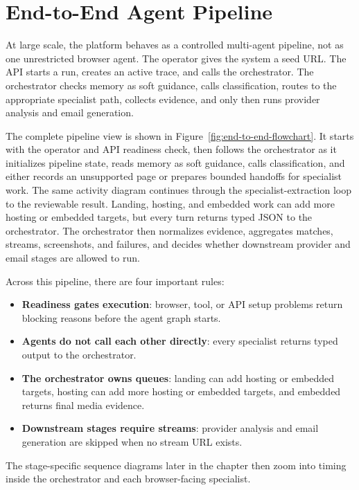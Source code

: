 \section{End-to-End Agent Pipeline}

At large scale, the platform behaves as a controlled multi-agent pipeline, not
as one unrestricted browser agent. The operator gives the system a seed URL\@.
The API starts a run, creates an active trace, and calls the orchestrator. The
orchestrator checks memory as soft guidance, calls classification, routes to the
appropriate specialist path, collects evidence, and only then runs provider
analysis and email generation.

The complete pipeline view is shown in Figure~\ref{fig:end-to-end-flowchart}.
It starts with the operator and API readiness check, then follows the orchestrator
as it initializes pipeline state, reads memory as soft guidance, calls
classification, and either records an unsupported page or prepares bounded
handoffs for specialist work. The same activity diagram continues through the
specialist-extraction loop to the reviewable result. Landing, hosting, and
embedded work can add more hosting or embedded targets, but every turn returns
typed JSON to the orchestrator. The orchestrator then normalizes evidence,
aggregates matches, streams, screenshots, and failures, and decides whether
downstream provider and email stages are allowed to run.

Across this pipeline, there are four important rules:
\begin{itemize}
  \item \textbf{Readiness gates execution}: browser, tool, or API setup problems
  return blocking reasons before the agent graph starts.
  \item \textbf{Agents do not call each other directly}: every specialist returns
  typed output to the orchestrator.
  \item \textbf{The orchestrator owns queues}: landing can add hosting or embedded
  targets, hosting can add more hosting or embedded targets, and embedded returns
  final media evidence.
  \item \textbf{Downstream stages require streams}: provider analysis and email
  generation are skipped when no stream URL exists.
\end{itemize}

The stage-specific sequence diagrams later in the chapter then zoom into timing
inside the orchestrator and each browser-facing specialist.
\clearpage

\clearpage
\FloatBarrier

